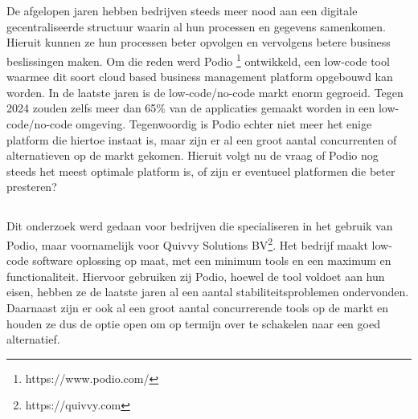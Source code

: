 
\chapter{}%
\label{ch:inleiding} %

De afgelopen jaren hebben bedrijven steeds meer nood aan een digitale gecentraliseerde structuur waarin al hun processen en gegevens samenkomen. Hieruit kunnen ze hun processen beter opvolgen en vervolgens betere business beslissingen maken. Om die reden werd Podio \footnote{https://www.podio.com/} ontwikkeld, een low-code tool waarmee dit soort cloud based business management platform opgebouwd kan worden. In de laatste jaren is de low-code/no-code markt enorm gegroeid. Tegen 2024 zouden zelfs meer dan 65\% van de applicaties gemaakt worden in een low-code/no-code omgeving. Tegenwoordig is Podio echter niet meer het enige platform die hiertoe instaat is, maar zijn er al een groot aantal concurrenten of alternatieven op de markt gekomen. Hieruit volgt nu de vraag of Podio nog steeds het meest optimale platform is, of zijn er eventueel platformen die beter presteren? 

\section{}%
\label{sec:probleemstelling} %


Dit onderzoek werd gedaan voor bedrijven die specialiseren in het gebruik van Podio, maar voornamelijk voor Quivvy Solutions BV\footnote{https://quivvy.com}. Het bedrijf maakt low-code software oplossing op maat, met een minimum tools en een maximum en functionaliteit. Hiervoor gebruiken zij Podio, hoewel de tool voldoet aan hun eisen, hebben ze de laatste jaren al een aantal stabiliteitsproblemen ondervonden. Daarnaast zijn er ook al een groot aantal concurrerende tools op de markt en houden ze dus de optie open om op termijn over te schakelen naar een goed alternatief. 

